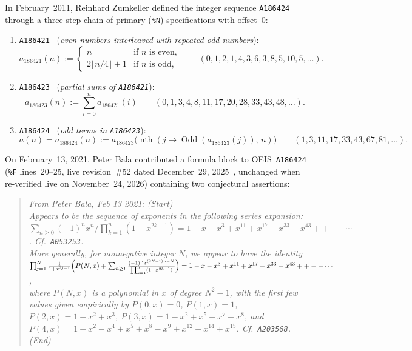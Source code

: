 \documentclass[11pt]{article}
\theoremstyle{definition}
\newcommand{\seq}[1]{\texttt{#1}}
\begin{document}
In February~2011, Reinhard Zumkeller defined the integer sequence \seq{A186424}~\cite{oeis186424} through a three-step chain of primary (\texttt{\%N}) specifications with offset~$0$:
\begin{enumerate}\setlength{\itemsep}{2pt}
\item \seq{A186421}~\cite{oeis186421} (\emph{even numbers interleaved with repeated odd numbers}):
\[
a_{186421}(n) := \begin{cases} n & \text{if } n \text{ is even}, \\ 2\lfloor n/4 \rfloor + 1 & \text{if } n \text{ is odd}, \end{cases}
\qquad (0, 1, 2, 1, 4, 3, 6, 3, 8, 5, 10, 5, \dots).
\]
\item \seq{A186423}~\cite{oeis186423} (\emph{partial sums of \seq{A186421}}):
\[
a_{186423}(n) := \sum_{i=0}^{n} a_{186421}(i)
\qquad (0, 1, 3, 4, 8, 11, 17, 20, 28, 33, 43, 48, \dots).
\]
\item \seq{A186424}~\cite{oeis186424} (\emph{odd terms in \seq{A186423}}):
\[
a(n) = a_{186424}(n) := a_{186423}\!\bigl(\operatorname{nth}(j \mapsto \operatorname{Odd}(a_{186423}(j)),\, n)\bigr)
\qquad (1, 3, 11, 17, 33, 43, 67, 81, \dots).
\]
\end{enumerate}

On February~13, 2021, Peter Bala contributed a formula block to OEIS~\seq{A186424} (\texttt{\%F} lines~20--25, live revision~\#52 dated December~29, 2025~\cite{oeis186424}, unchanged when re-verified live on November~24, 2026) containing two conjectural assertions:
\begin{quote}\itshape
From Peter Bala, Feb 13 2021: (Start)\\
Appears to be the sequence of exponents in the following series expansion:\\
$\sum_{n \ge 0} (-1)^n x^n / \prod_{k = 1}^{n} (1 - x^{2k-1}) = 1 - x - x^3 + x^{11} + x^{17} - x^{33} - x^{43} + + - - \cdots$. Cf.~\seq{A053253}.\\
More generally, for nonnegative integer $N$, we appear to have the identity\\
$\prod_{j = 1}^{N} \frac{1}{1 + x^{2j-1}} \Bigl(P(N, x) + \sum_{n \ge 1} \frac{(-1)^n x^{(2N+1)n - N}}{\prod_{k = 1}^{n} (1 - x^{2k-1})}\Bigr) = 1 - x - x^3 + x^{11} + x^{17} - x^{33} - x^{43} + + - - \cdots$,\\
where $P(N, x)$ is a polynomial in $x$ of degree $N^2 - 1$, with the first few values given empirically by $P(0, x) = 0$, $P(1, x) = 1$, $P(2, x) = 1 - x^2 + x^3$, $P(3, x) = 1 - x^2 + x^5 - x^7 + x^8$, and $P(4, x) = 1 - x^2 - x^4 + x^5 + x^8 - x^9 + x^{12} - x^{14} + x^{15}$. Cf.~\seq{A203568}. (End)
\end{quote}
\end{document}
